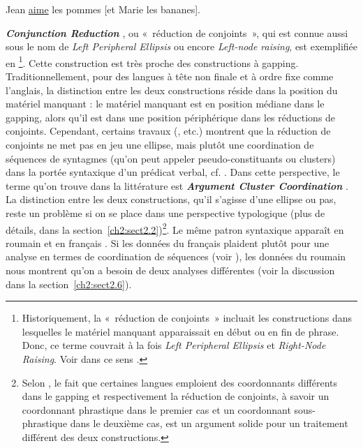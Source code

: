 \ea
Jean \uline{aime} les pommes [et Marie les bananes]. \label{ch1:ex44}  
\z

\textbf{\textit{Conjunction Reduction}} \citep{Jackendoff1971}, ou «~réduction de conjoints~», qui est connue aussi sous le nom de \textit{Left Peripheral Ellipsis} ou encore \textit{Left-node raising}, est exemplifiée en \footnote{Historiquement, la «~réduction de conjoints~» incluait les constructions dans lesquelles le matériel manquant apparaissait en début ou en fin de phrase. Donc, ce terme couvrait à la fois \textit{Left Peripheral Ellipsis} et \textit{Right-Node Raising}. Voir dans ce sens \citet{Jackendoff1971}.}. Cette construction est très proche des constructions à gapping. Traditionnellement, pour des langues à tête non finale et à ordre fixe comme l’anglais, la distinction entre les deux constructions réside dans la position du matériel manquant : le matériel manquant est en position médiane dans le gapping, alors qu’il est dans une position périphérique dans les réductions de conjoints. Cependant, certains travaux (\citealt{Dowty1988,Hudson1988,MaxwellEtAl1996,Steedman2000,Mouret2006,Mouret2007}, etc.) montrent que la réduction de conjoints ne met pas en jeu une ellipse, mais plutôt une coordination de séquences de syntagmes (qu’on peut appeler pseudo-constituants ou clusters) dans la portée syntaxique d’un prédicat verbal, cf. . Dans cette perspective, le terme qu’on trouve dans la littérature est \textbf{\textit{Argument Cluster Coordination}} \citep{Steedman2000}. La distinction entre les deux constructions, qu’il s’agisse d’une ellipse ou pas, reste un problème si on se place dans une perspective typologique (plus de détails, dans la section~\ref{ch2:sect2.2})\footnote{Selon \citet{Haspelmath2007}, le fait que certaines langues emploient des coordonnants différents dans le gapping et respectivement la réduction de conjoints, à savoir un coordonnant phrastique dans le premier cas et un coordonnant sous-phrastique dans le deuxième cas, est un argument solide pour un traitement différent des deux constructions.}. Le même patron syntaxique apparaît en roumain  et en français . Si les données du français plaident plutôt pour une analyse en termes de coordination de séquences (voir \citealt{Mouret2006,Mouret2007}), les données du roumain nous montrent qu’on a besoin de deux analyses différentes (voir la discussion dans la section~\ref{ch2:sect2.6}). 

